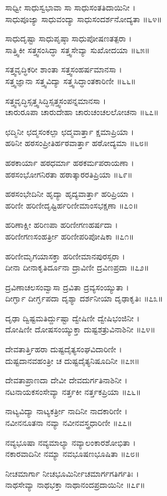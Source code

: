 ಸಾಧ್ವೀ ಸಾಧುಸ್ವಭಾವಾ ಸಾ ಸಾಧುಸಂತತಿದಾಯಿನೀ ।\\
ಸಾಧುಪೂಜ್ಯಾ ಸಾಧುವಂದ್ಯಾ ಸಾಧುಸಂದರ್ಶನೋದ್ಯತಾ ॥೬೪॥

ಸಾಧುದೃಷ್ಟಾ ಸಾಧುಪೃಷ್ಠಾ ಸಾಧುಪೋಷಣತತ್ಪರಾ ।\\
ಸಾತ್ತ್ವಿಕೀ ಸತ್ತ್ವಸಂಸಿದ್ಧಾ ಸತ್ತ್ವಸೇವ್ಯಾ ಸುಖೋದಯಾ ॥೬೫॥

ಸತ್ತ್ವವೃದ್ಧಿಕರೀ ಶಾಂತಾ ಸತ್ತ್ವಸಂಹರ್ಷಮಾನಸಾ ।\\
ಸತ್ತ್ವಜ್ಞಾನಾ ಸತ್ತ್ವವಿದ್ಯಾ ಸತ್ತ್ವಸಿದ್ಧಾಂತಕಾರಿಣೀ ॥೬೬॥

ಸತ್ತ್ವವೃದ್ಧಿಸ್ಸತ್ತ್ವಸಿದ್ಧಿಸ್ಸತ್ತ್ವಸಂಪನ್ನಮಾನಸಾ ।\\
ಚಾರುರೂಪಾ ಚಾರುದೇಹಾ ಚಾರುಚಂಚಲಲೋಚನಾ ॥೬೭॥

ಛದ್ಮಿನೀ ಛದ್ಮಸಂಕಲ್ಪಾ ಛದ್ಮವಾರ್ತ್ತಾ ಕ್ಷಮಾಪ್ರಿಯಾ ।\\
ಹಠಿನೀ ಹಠಸಂಪ್ರೀತಿರ್ಹಠವಾರ್ತ್ತಾ ಹಠೋದ್ಯಮಾ ॥೬೮॥

ಹಠಕಾರ್ಯಾ ಹಠಧರ್ಮಾ ಹಠಕರ್ಮಪರಾಯಣಾ ।\\
ಹಠಸಂಭೋಗನಿರತಾ ಹಠಾತ್ಕಾರರತಿಪ್ರಿಯಾ ॥೬೯॥

ಹಠಸಂಭೇದಿನೀ ಹೃದ್ಯಾ ಹೃದ್ಯವಾರ್ತ್ತಾ ಹರಿಪ್ರಿಯಾ ।\\
ಹರಿಣೀ ಹರಿಣೀದೃಷ್ಟಿರ್ಹರಿಣೀಮಾಂಸಭಕ್ಷಣಾ ॥೭೦॥

ಹರಿಣಾಕ್ಷೀ ಹರಿಣಪಾ ಹರಿಣೀಗಣಹರ್ಷದಾ ।\\
ಹರಿಣೀಗಣಸಂಹರ್ತ್ರೀ ಹರಿಣೀಪರಿಪೋಷಿಕಾ ॥೭೧॥

ಹರಿಣೀಮೃಗಯಾಸಕ್ತಾ ಹರಿಣೀಮಾನಪುರಸ್ಸರಾ ।\\
ದೀನಾ ದೀನಾಕೃತಿರ್ದೂನಾ ದ್ರಾವಿಣೀ ದ್ರವಿಣಪ್ರದಾ ॥೭೨॥

ದ್ರವಿಣಾಚಲಸಂವ್ವಾಸಾ ದ್ರವಿತಾ ದ್ರವ್ಯಸಂಯ್ಯುತಾ ।\\
ದೀರ್ಗ್ಘಾ ದೀರ್ಗ್ಘಪದಾ ದೃಶ್ಯಾ ದರ್ಶನೀಯಾ ದೃಢಾಕೃತಿಃ ॥೭೩॥

ದೃಢಾ ದ್ವಿಷ್ಟಮತಿರ್ದ್ದುಷ್ಟಾ ದ್ವೇಷಿಣೀ ದ್ವೇಷಿಭಂಜಿನೀ ।\\
ದೋಷಿಣೀ ದೋಷಸಂಯ್ಯುಕ್ತಾ ದುಷ್ಟಶತ್ರುವಿನಾಶಿನೀ ॥೭೪॥

ದೇವತಾರ್ತ್ತಿಹರಾ ದುಷ್ಟದೈತ್ಯಸಂಘವಿದಾರಿಣೀ ।\\
ದುಷ್ಟದಾನವಹಂತ್ರೀ ಚ ದುಷ್ಟದೈತ್ಯನಿಷೂದಿನೀ ॥೭೫॥

ದೇವತಾಪ್ರಾಣದಾ ದೇವೀ ದೇವದುರ್ಗತಿನಾಶಿನೀ ।\\
ನಟನಾಯಕಸಂಸೇವ್ಯಾ ನರ್ತ್ತಕೀ ನರ್ತ್ತಕಪ್ರಿಯಾ ॥೭೬॥

ನಾಟ್ಯವಿದ್ಯಾ ನಾಟ್ಯಕರ್ತ್ರೀ ನಾದಿನೀ ನಾದಕಾರಿಣೀ ।\\
ನವೀನನೂತನಾ ನವ್ಯಾ ನವೀನವಸ್ತ್ರಧಾರಿಣೀ ॥೭೭॥

ನವ್ಯಭೂಷಾ ನವ್ಯಮಾಲ್ಯಾ ನವ್ಯಾಲಂಕಾರಶೋಭಿತಾ ।\\
ನಕಾರವಾದಿನೀ ನಮ್ಯಾ ನವಭೂಷಣಭೂಷಿತಾ ॥೭೮॥

ನೀಚಮಾರ್ಗಾ ನೀಚಭೂಮಿರ್ನೀಚಮಾರ್ಗಗತಿರ್ಗತಿಃ ।\\
ನಾಥಸೇವ್ಯಾ ನಾಥಭಕ್ತಾ ನಾಥಾನಂದಪ್ರದಾಯಿನೀ ॥೭೯॥

